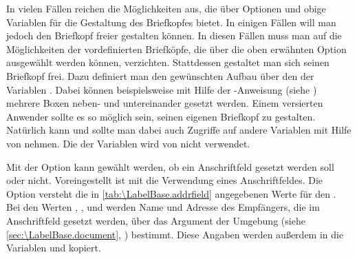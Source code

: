 \begin{Declaration}
\end{Declaration}
In vielen Fällen reichen die Möglichkeiten aus, die  über
Optionen und obige Variablen für die Gestaltung des Briefkopfes bietet. In
einigen Fällen will man jedoch den Briefkopf freier gestalten können. In
diesen Fällen muss man auf die Möglichkeiten der vordefinierten Briefköpfe,
die über die oben erwähnten Option ausgewählt werden können,
verzichten. Stattdessen gestaltet man sich seinen Briefkopf frei. Dazu
definiert man den gewünschten Aufbau über den  der Variablen
. Dabei können beispielsweise mit Hilfe der
-Anweisung (siehe \cite{latex:usrguide}) mehrere Boxen neben-
und untereinander gesetzt werden.  Einem versierten Anwender sollte es so
möglich sein, seinen eigenen Briefkopf zu gestalten. Natürlich kann und sollte
man dabei auch Zugriffe auf andere Variablen mit Hilfe von
 nehmen. Die  der
Variablen  wird von \KOMAScript{} nicht verwendet.
%
\EndIndexGroup


\begin{Declaration}
\end{Declaration}%
%
Mit der Option  kann gewählt werden, ob ein Anschriftfeld
gesetzt werden soll oder nicht. Voreingestellt ist
mit  die Verwendung eines Anschriftfeldes.  Die Option versteht
die in \autoref{tab:\LabelBase.addrfield}
angegebenen Werte für den .  Bei den Werten ,
,  und  werden Name
und Adresse des Empfängers, die im Anschriftfeld gesetzt werden, über das
Argument der Umgebung  (siehe
\autoref{sec:\LabelBase.document}, )
bestimmt. Diese Angaben werden außerdem in die Variablen  und
 kopiert.

